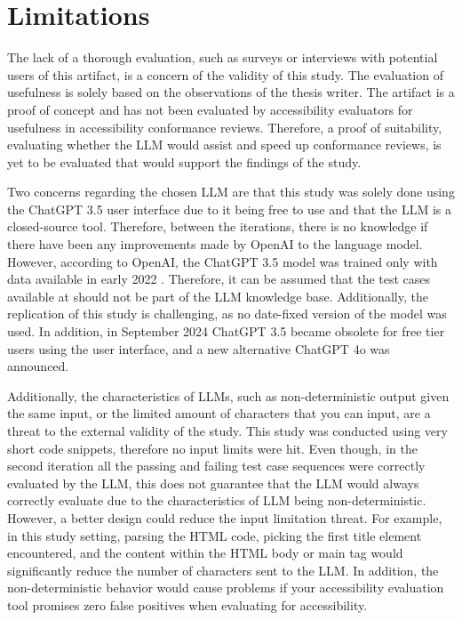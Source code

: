 \section{Limitations}

The lack of a thorough evaluation, such as surveys or interviews with potential users of this artifact, is a concern of the validity of this study. The evaluation of usefulness is solely based on the observations of the thesis writer. The artifact is a proof of concept and has not been evaluated by accessibility evaluators for usefulness in accessibility conformance reviews. Therefore, a proof of suitability, evaluating whether the LLM would assist and speed up conformance reviews, is yet to be evaluated that would support the findings of the study. 

Two concerns regarding the chosen LLM are that this study was solely done using the ChatGPT 3.5 user interface due to it being free to use and that the LLM is a closed-source tool. Therefore, between the iterations, there is no knowledge if there have been any improvements made by OpenAI to the language model. However, according to OpenAI, the ChatGPT 3.5 model was trained only with data available in early 2022 \citep{openai_35}. Therefore, it can be assumed that the test cases available at \textcite{act_rule_g88} should not be part of the LLM knowledge base. Additionally, the replication of this study is challenging, as no date-fixed version of the model was used. In addition, in September 2024 ChatGPT 3.5 became obsolete for free tier users using the user interface, and a new alternative ChatGPT 4o was announced.

Additionally, the characteristics of LLMs, such as non-deterministic output given the same input, or the limited amount of characters that you can input, are a threat to the external validity of the study. This study was conducted using very short code snippets, therefore no input limits were hit. Even though, in the second iteration all the passing and failing test case sequences were correctly evaluated by the LLM, this does not guarantee that the LLM would always correctly evaluate due to the characteristics of LLM being non-deterministic. However, a better design could reduce the input limitation threat. For example, in this study setting, parsing the HTML code, picking the first title element encountered, and the content within the HTML body or main tag would significantly reduce the number of characters sent to the LLM. In addition, the non-deterministic behavior would cause problems if your accessibility evaluation tool promises zero false positives when evaluating for accessibility.

